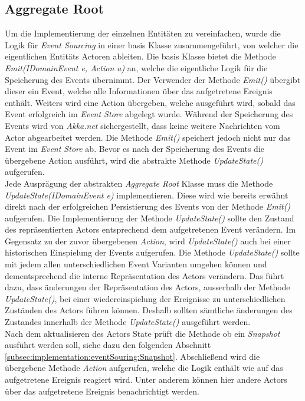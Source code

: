 \subsection{Aggregate Root}
Um die Implementierung der einzelnen Entitäten zu vereinfachen, wurde die Logik für \textit{Event Sourcing} in einer basis Klasse zusammengeführt, von welcher die eigentlichen Entitäts Actoren ableiten. 
Die basis Klasse bietet die Methode \textit{Emit(IDomainEvent e, Action a)} an, welche die eigentliche Logik für die Speicherung des Events übernimmt. Der Verwender der Methode \textit{Emit()} übergibt dieser ein Event, welche alle Informationen über das aufgetretene Ereignis enthält. Weiters wird eine Action übergeben, welche ausgeführt wird, sobald das Event erfolgreich im \textit{Event Store} abgelegt wurde. Während der Speicherung des Events wird von \textit{Akka.net} sichergestellt, dass keine weitere Nachrichten vom Actor abgearbeitet werden. Die Methode \textit{Emit()} speichert jedoch nicht nur das Event im \textit{Event Store} ab. Bevor es nach der Speicherung des Events die übergebene Action ausführt, wird die abstrakte Methode \textit{UpdateState()} aufgerufen. \\
Jede Ausprägung der abstrakten \textit{Aggregate Root} Klasse muss die Methode \textit{UpdateState(IDomainEvent e)} implementieren. Diese wird wie bereits erwähnt direkt nach der erfolgreichen Persistierung des Events von der Methode \textit{Emit()} aufgerufen. Die Implementierung der Methode \textit{UpdateState()} sollte den Zustand des repräsentierten Actors entsprechend dem aufgetretenen Event verändern. Im Gegensatz zu der zuvor übergebenen \textit{Action}, wird \textit{UpdateState()} auch bei einer historischen Einspielung der Events aufgerufen. Die Methode \textit{UpdateState()} sollte mit jedem allen unterschiedlichen Event Varianten umgehen können und dementsprechend die interne Repräsentation des Actors verändern. Das führt dazu, dass änderungen der Repräsentation des Actors, ausserhalb der Methode \textit{UpdateState()}, bei einer wiedereinspielung der Ereignisse zu unterschiedlichen Zuständen des Actors führen können. Deshalb sollten sämtliche änderungen des Zustandes innerhalb der Methode \textit{UpdateState()} ausgeführt werden. \\
Nach dem aktualisieren des Actors State prüft die Methode ob ein \textit{Snapshot} ausführt werden soll, siehe dazu den folgenden Abschnitt \ref{subsec:implementation:eventSouring:Snapshot}. Abschließend wird die übergebene Methode \textit{Action} aufgerufen, welche die Logik enthält wie auf das aufgetretene Ereignis reagiert wird. Unter anderem können hier andere Actors über das aufgetretene Ereignis benachrichtigt werden. \\
